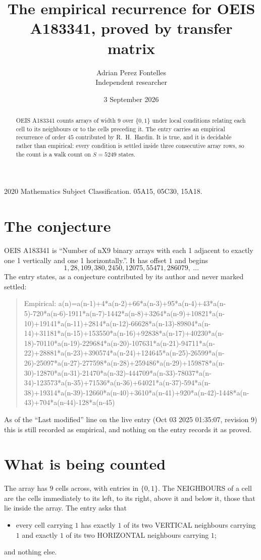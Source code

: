 \documentclass[11pt,a4paper]{article}
\title{The empirical recurrence for OEIS A183341, proved by transfer matrix}
\author{Adrian Perez Fontelles\\ \small Independent researcher}
\date{3 September 2026}
\theoremstyle{plain}
\theoremstyle{definition}
\begin{document}
\maketitle

\begin{abstract}
OEIS A183341 counts arrays of width $9$ over $\{0,1\}$ under local conditions relating each cell
to its neighbours or to the cells preceding it. The entry carries an empirical recurrence of
order $45$ contributed by R.~H.~Hardin. It is true, and it is decidable rather than
empirical: every condition is settled inside three consecutive array rows, so the count is a
walk count on $S=5249$ states.
\end{abstract}

\noindent\small 2020 Mathematics Subject Classification. 05A15, 05C30, 15A18.\normalsize

\section{The conjecture}

OEIS A183341 is ``Number of nX9 binary arrays with each 1 adjacent to exactly one 1 vertically and one 1 horizontally.''. It has offset $1$ and begins
\[
1, 28, 109, 380, 2450, 12075, 55471, 286079,\ \dots
\]
The entry states, as a conjecture contributed by its author and never marked settled:
\begin{quote}
Empirical: a(n)=a(n-1)+4*a(n-2)+66*a(n-3)+95*a(n-4)+43*a(n-5)-720*a(n-6)-1911*a(n-7)-1442*a(n-8)+3264*a(n-9)+10821*a(n-10)+19141*a(n-11)+2814*a(n-12)-66628*a(n-13)-89804*a(n-14)+31181*a(n-15)+153550*a(n-16)+92838*a(n-17)+40230*a(n-18)-70110*a(n-19)-229684*a(n-20)-107631*a(n-21)-94711*a(n-22)+28881*a(n-23)+390574*a(n-24)+124645*a(n-25)-26599*a(n-26)-25097*a(n-27)-277598*a(n-28)+259486*a(n-29)+159878*a(n-30)-12870*a(n-31)-21470*a(n-32)-444709*a(n-33)-78037*a(n-34)-123573*a(n-35)+71536*a(n-36)+64021*a(n-37)-594*a(n-38)+19314*a(n-39)-12660*a(n-40)+3610*a(n-41)+920*a(n-42)-1448*a(n-43)+704*a(n-44)-128*a(n-45)
\end{quote}
As of the ``Last modified'' line on the live entry (Oct 03 2025 01:35:07, revision 9) this is still
recorded as empirical, and nothing on the entry records it as proved.

\section{What is being counted}

The array has $9$ cells across, with entries in $\{0,1\}$. The NEIGHBOURS of a cell are the
cells immediately to its left, to its right, above it and below it, those that lie inside the
array. The entry asks that
\begin{itemize}
\item every cell carrying $1$ has exactly $1$ of its two VERTICAL neighbours carrying $1$ and exactly $1$ of its two HORIZONTAL neighbours carrying $1$;
\end{itemize}
and nothing else.
\end{document}
